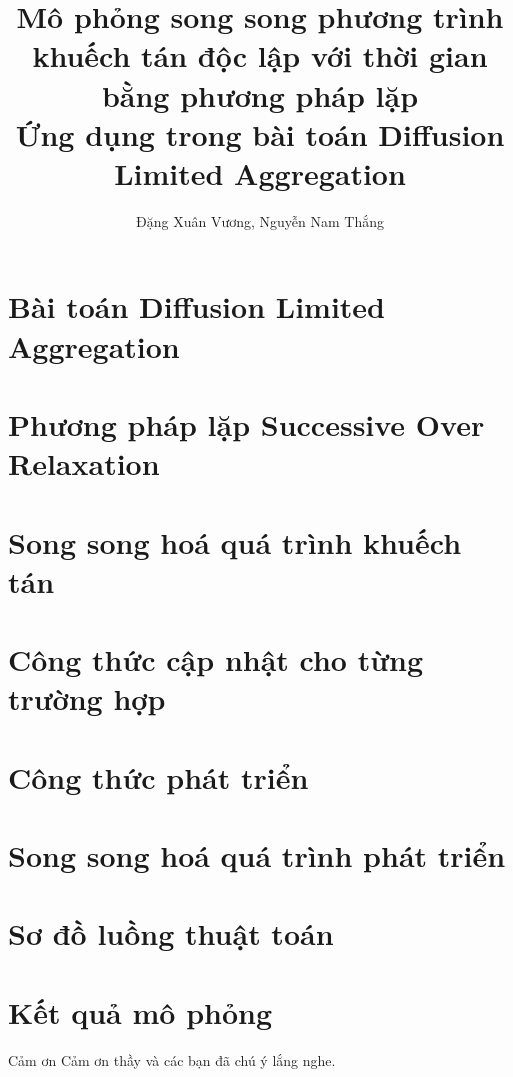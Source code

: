 \documentclass[11pt]{beamer}
\title[Hà Nội, Việt Nam]{Mô phỏng song song phương trình khuếch tán độc lập với thời gian bằng phương pháp lặp\\
Ứng dụng trong bài toán Diffusion Limited Aggregation}
\author[Xuân Vương, Nam Thắng]{
Đặng Xuân Vương, Nguyễn Nam Thắng}
\begin{document}


\section{Bài toán Diffusion Limited Aggregation} 


\section{Phương pháp lặp Successive Over Relaxation}


\section{Song song hoá quá trình khuếch tán}


\section{Công thức cập nhật cho từng trường hợp}


\section{Công thức phát triển}


\section{Song song hoá quá trình phát triển}


\section{Sơ đồ luồng thuật toán}


\section{Kết quả mô phỏng}


\begin{frame}{Cảm ơn}
    \large{Cảm ơn thầy và các bạn đã chú ý lắng nghe.}
\end{frame}

\begin{frame}
\titlepage 
\end{frame}
\end{document}
